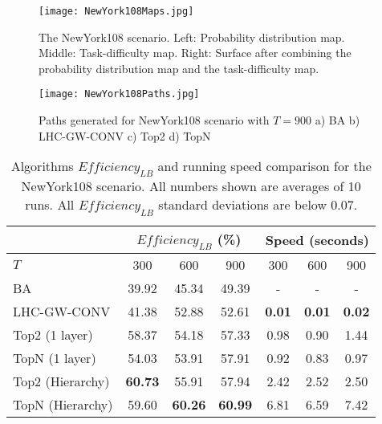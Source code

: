 \begin{figure}
\centering
\texttt{[image: NewYork108Maps.jpg]}
\caption[The NewYork108 scenario]{The NewYork108 scenario. Left: Probability distribution map. Middle: Task-difficulty map. Right: Surface after combining the probability distribution map and the task-difficulty map.}
\label{NewYork108Maps}
\end{figure}
\begin{figure}
\centering
\texttt{[image: NewYork108Paths.jpg]}
\caption[Paths generated for NewYork108 scenario with $T=900$]{Paths generated for NewYork108 scenario with $T=900$ a) BA b) LHC-GW-CONV c) Top2 d) TopN}
\label{NewYork108Paths}
\end{figure}
\begin{table}
\caption[Algorithms $\mathit{Efficiency_{LB}}$ and running speed comparison for the NewYork108 scenario]{Algorithms $\mathit{Efficiency_{LB}}$ and running speed comparison for the NewYork108 scenario. All numbers shown are averages of 10 runs. All $\mathit{Efficiency_{LB}}$ standard deviations are below 0.07.}
	\centering
		\begin{tabular}
			{|l|c|c|c|c|c|c|}
			\hline
			 & \multicolumn{3}{|c|}{$\mathit{Efficiency_{LB}}$ (\%)} & \multicolumn{3}{|c|}{Speed (seconds)} \\
			\hline
			$T$ & 300 & 600 & 900	& 300 & 600 & 900 \\
			\hline
			BA & 39.92 & 45.34 & 49.39 & - & - & - \\
			\hline			
			LHC-GW-CONV & 41.38 & 52.88 & 52.61 & \textbf{0.01} & \textbf{0.01} & \textbf{0.02} \\
			\hline			
			Top2 (1 layer)	& 58.37 & 54.18 & 57.33 & 0.98 & 0.90 & 1.44 \\ 
			\hline
			TopN (1 layer)	& 54.03 & 53.91 & 57.91 & 0.92 & 0.83 & 0.97 \\ 
			\hline
			Top2 (Hierarchy) & \textbf{60.73} & 55.91 & 57.94 & 2.42 & 2.52 & 2.50 \\ 
			\hline
			TopN (Hierarchy) & 59.60 & \textbf{60.26} & \textbf{60.99} & 6.81 & 6.59 & 7.42 \\ 
			\hline			
		\end{tabular}
\label{NewYork108}
\end{table}

